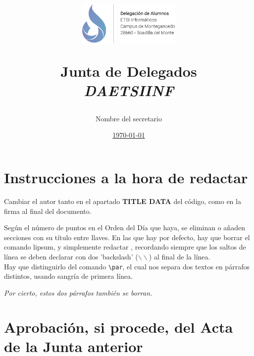 \documentclass[12pt,spanish,a4paper]{article}
\title{
  \begin{flushright}
    \includegraphics[width=5cm]{include/daetsiinf-header.png}
  \end{flushright}
  \textbf{Junta de Delegados}\\
	\emph{DAETSIINF}}
\author{Nombre del secretario}
\date{\underline{\today}}
\begin{document}
	\maketitle
	\thispagestyle{empty}
	\renewcommand*\contentsname{Orden del día}
	\tableofcontents
	\pagebreak
    \section*{Instrucciones a la hora de redactar}
      Cambiar el autor tanto en el apartado \textbf{TITLE DATA} del código, como en la firma al final del documento. \par
      Según el número de puntos en el Orden del Día que haya, se eliminan o añaden secciones con su título entre llaves.
      En las que hay por defecto, hay que borrar el comando lipsum, y simplemente redactar , recordando siempre que los saltos de línea se deben declarar con dos 'backslash' ($\backslash \backslash$) al
      final de la línea. \\
      Hay que distinguirlo del comando \verb=\par=, el cual nos separa dos textos en párrafos distintos, usando sangría de primera línea.\par
      \textit{Por cierto, estos dos párrafos también se borran.}
    \section{Aprobación, si procede, del Acta de la Junta anterior}
      \lipsum[1]
    \newpage
    \section{}
      \lipsum[2]
    \newpage
    \section{}
      \lipsum[3]
    \newpage
    \section{}
      \lipsum[4]
    \newpage
    \section{}
      \lipsum[5]
    \newpage
    \section{}
      \lipsum[6]
    \newpage
\end{document}

